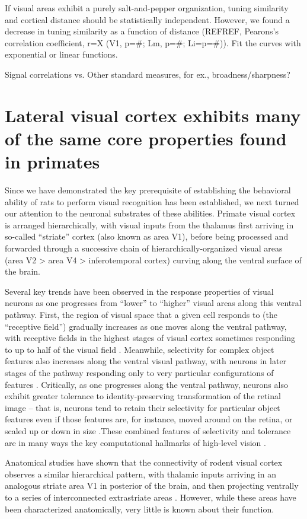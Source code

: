 If visual areas exhibit a purely salt-and-pepper organization, tuning similarity and cortical distance should be statistically independent. However, we found a decrease in tuning similarity as a function of distance (REFREF, Pearons’s correlation coefficient, r=X (V1, p=#; Lm, p=#; Li=p=#)). Fit the curves with exponential or linear functions. 

Signal correlations vs. %
Other standard measures, for ex., broadness/sharpness?







\section{Lateral visual cortex exhibits many of the same core properties found in primates}

Since we have demonstrated the key prerequisite of establishing the behavioral ability of rats to perform visual recognition has been established, we next turned our attention to the neuronal substrates of these abilities.  Primate visual cortex is arranged hierarchically, with visual inputs from the thalamus first arriving in so-called ``striate'' cortex (also known as area V1), before being processed and forwarded through a successive chain of hierarchically-organized visual areas (area V2 > area V4 > inferotemporal cortex) curving along the ventral surface of the brain.  

Several key trends have been observed in the response properties of visual neurons as one progresses from ``lower'' to ``higher'' visual areas along this ventral pathway. First, the region of visual space that a given cell responds to (the ``receptive field'') gradually increases as one moves along the ventral pathway, with receptive fields in the highest stages of visual cortex sometimes responding to up to half of the visual field \cite{op2000spatial}. Meanwhile, selectivity for complex object features also increases along the ventral visual pathway, with neurons in later stages of the pathway responding only to very particular configurations of features \cite{Desimone1984, Logothetis1996}.  Critically, as one progresses along the ventral pathway, neurons also exhibit greater tolerance to identity-preserving transformation of the retinal image -- that is, neurons tend to retain their selectivity for particular object features even if those features are, for instance, moved around on the retina, or scaled up or down in size \cite{Ito1995}.These combined features of selectivity and tolerance are in many ways the key computational hallmarks of high-level vision \cite{DiCarlo2007, DiCarlo2012}. 

Anatomical studies have shown that the connectivity of rodent visual cortex observes a similar hierarchical pattern, with thalamic inputs arriving in an analogous striate area V1 in posterior of the brain, and then projecting ventrally to a series of interconnected extrastriate areas  \cite{Coogan1993, ETC}.  However, while these areas have been characterized anatomically, very little is known about their function.

